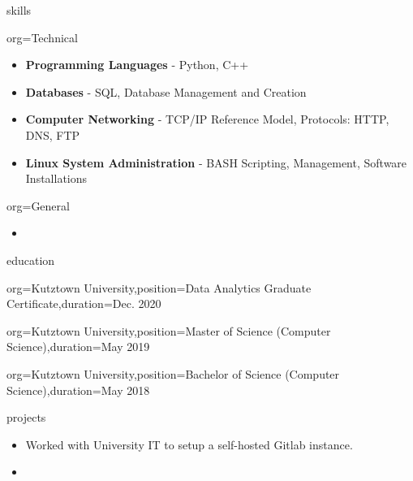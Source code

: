 \documentclass{resume}
\begin{document}
\begin{ResumeSection}{skills}
    \newcommand{\skill}[2]{\textbf{#1} - #2}
    \begin{ResumeSubsection}{org=Technical}
        \begin{itemize}
            \item \skill{Programming Languages}{Python, C++}
            \item \skill{Databases}{SQL, Database Management and Creation}
            \item \skill{Computer Networking}{TCP/IP Reference Model, Protocols: HTTP, DNS, FTP}
            \item \skill{Linux System Administration}{BASH Scripting, Management, Software Installations}
        \end{itemize}
    \end{ResumeSubsection}
    \begin{ResumeSubsection}{org=General}
        \begin{itemize}
            \item \lipsum[1][1]
        \end{itemize}
    \end{ResumeSubsection}
\end{ResumeSection}

\begin{ResumeSection}{education}
    \begin{ResumeSubsection}{org={Kutztown University},position={Data Analytics Graduate Certificate},duration={Dec. 2020}}
    \end{ResumeSubsection}
    \begin{ResumeSubsection}{org={Kutztown University},position={Master of Science (Computer Science)},duration={May 2019}}        
    \end{ResumeSubsection}
    \begin{ResumeSubsection}{org={Kutztown University},position={Bachelor of Science (Computer Science)},duration={May 2018}}
    \end{ResumeSubsection}
\end{ResumeSection}

\begin{ResumeSection}{projects}
    \begin{itemize}
        \item Worked with University IT to setup a self-hosted Gitlab instance.
        \item 
    \end{itemize}
\end{ResumeSection}
\end{document}
